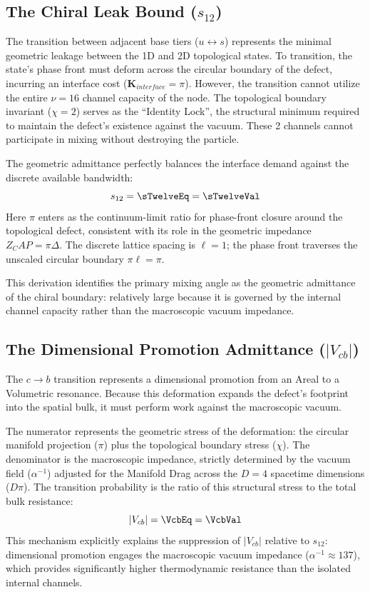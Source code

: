 \subsection{The Chiral Leak Bound (\texorpdfstring{$s_{12}$}{s12})}
The transition between adjacent base tiers ($u \leftrightarrow s$) represents the minimal geometric leakage between the 1D and 2D topological states. To transition, the state's phase front must deform across the circular boundary of the defect, incurring an interface cost ($\mathbf{K}_{interface} = \pi$). However, the transition cannot utilize the entire $\nu=16$ channel capacity of the node. The topological boundary invariant ($\chi=2$) serves as the ``Identity Lock'', the structural minimum required to maintain the defect's existence against the vacuum. These 2 channels cannot participate in mixing without destroying the particle. 

The geometric admittance perfectly balances the interface demand against the discrete available bandwidth:
\begin{equation}
    s_{12} = \sTwelveEq = \sTwelveVal
\end{equation}
Here $\pi$ enters as the continuum-limit ratio for phase-front closure around the topological defect, consistent with its role in the geometric impedance $Z_CAP = \pi \Delta$. The discrete lattice spacing is $\ell = 1$; the phase front traverses the unscaled circular boundary $\pi\ell = \pi$.

This derivation identifies the primary mixing angle as the geometric admittance of the chiral boundary: relatively large because it is governed by the internal channel capacity rather than the macroscopic vacuum impedance. \sTwelveAccText



\subsection{The Dimensional Promotion Admittance (\texorpdfstring{$|V_{cb}|$}{Vcb})}
The $c \rightarrow b$ transition represents a dimensional promotion from an Areal to a Volumetric resonance. Because this deformation expands the defect's footprint into the spatial bulk, it must perform work against the macroscopic vacuum.

The numerator represents the geometric stress of the deformation: the circular manifold projection ($\pi$) plus the topological boundary stress ($\chi$). The denominator is the macroscopic impedance, strictly determined by the vacuum field ($\alpha^{-1}$) adjusted for the Manifold Drag across the $D=4$ spacetime dimensions ($D\pi$). The transition probability is the ratio of this structural stress to the total bulk resistance:
\begin{equation}
    |V_{cb}| = \VcbEq = \VcbVal
\end{equation}
This mechanism explicitly explains the suppression of $|V_{cb}|$ relative to $s_{12}$: dimensional promotion engages the macroscopic vacuum impedance ($\alpha^{-1} \approx 137$), which provides significantly higher thermodynamic resistance than the isolated internal channels. \VcbAccText

